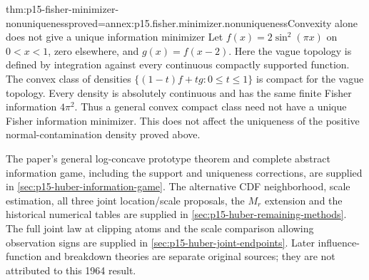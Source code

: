 \begin{hbtheorem}{thm:p15-fisher-minimizer-nonuniqueness}{proved=annex:p15.fisher.minimizer.nonuniqueness}{Convexity alone does not give a unique information minimizer}
Let \(f(x)=2\sin^2(\pi x)\) on \(0<x<1\), zero elsewhere,
and \(g(x)=f(x-2)\). Here the vague topology is defined by integration
against every continuous compactly supported function.
The convex class of densities
\(\{(1-t)f+tg:0\leq t\leq1\}\) is compact for the vague topology.
Every density is absolutely continuous and has the same finite
Fisher information \(4\pi^2\).
Thus a general convex compact class need not have a unique Fisher
information minimizer. This does not affect the uniqueness of the
positive normal-contamination density proved above.
\end{hbtheorem}

The paper's general log-concave prototype theorem and complete abstract
information game, including the support and uniqueness corrections, are
supplied in \cref{sec:p15-huber-information-game}.
The alternative CDF neighborhood, scale estimation, all three joint
location/scale proposals, the \(M_r\) extension and the historical
numerical tables are supplied in \cref{sec:p15-huber-remaining-methods}.
The full joint law at clipping atoms and the scale comparison allowing
observation signs are supplied in \cref{sec:p15-huber-joint-endpoints}.
Later influence-function and breakdown theories are separate original
sources; they are not attributed to this 1964 result.
